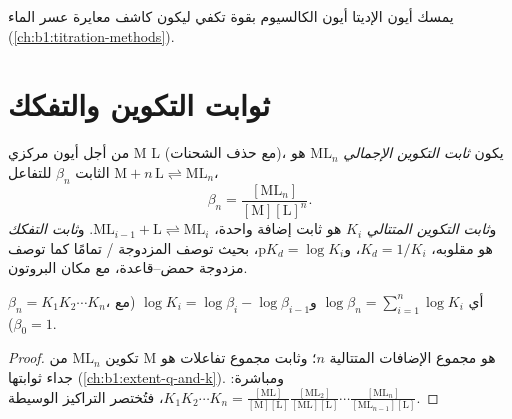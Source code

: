 يمسك أيون الإديتا أيون الكالسيوم بقوة تكفي ليكون كاشف
معايرة عسر الماء (\cref{ch:b1:titration-methods}).

\section{ثوابت التكوين والتفكك}

\begin{definition}\label{def:b1:complexation:formation-constant}
من أجل أيون مركزي M  L (مع حذف الشحنات)، يكون \emph{ثابت
التكوين الإجمالي} 
$\mathrm{ML}_n$ هو الثابت $\beta_n$ للتفاعل
$\mathrm{M} + n\,\mathrm{L} \rightleftharpoons \mathrm{ML}_n$،
\[
  \beta_n = \frac{[\mathrm{ML}_n]}{[\mathrm{M}][\mathrm{L}]^n} .
\]
و\emph{ثابت التكوين المتتالي}
$K_i$ هو ثابت إضافة  واحدة،
$\mathrm{ML}_{i-1} + \mathrm{L} \rightleftharpoons \mathrm{ML}_i$.
و\emph{ثابت التفكك} هو
مقلوبه، $K_d = 1/K_i$، و$\mathrm{p}K_d = \log K_i$، بحيث توصف
المزدوجة / تمامًا كما توصف مزدوجة حمض--قاعدة، مع
 مكان البروتون.
\end{definition}

\begin{proposition}\label{prop:b1:complexation:beta-k}
$\beta_n = K_1 K_2 \cdots K_n$، أي
$\log\beta_n = \sum_{i=1}^n \log K_i$ و$\log K_i = \log\beta_i -
\log\beta_{i-1}$ (مع $\beta_0 = 1$).
\end{proposition}

\begin{proof}
تكوين $\mathrm{ML}_n$ من M هو مجموع الإضافات المتتالية
$n$؛ وثابت مجموع تفاعلات هو جداء
ثوابتها (\cref{ch:b1:extent-q-and-k}). ومباشرة:
$K_1 K_2\cdots K_n = \frac{[\mathrm{ML}]}{[\mathrm{M}][\mathrm{L}]}
\frac{[\mathrm{ML_2}]}{[\mathrm{ML}][\mathrm{L}]}\cdots
\frac{[\mathrm{ML}_n]}{[\mathrm{ML}_{n-1}][\mathrm{L}]}$، فتُختصر
التراكيز الوسيطة.
\end{proof}

